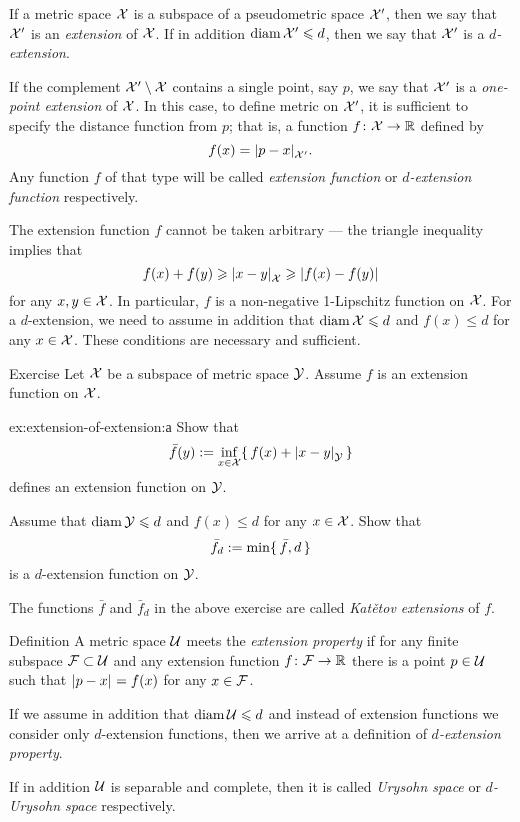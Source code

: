 If a metric space $\mathcal{X}$ is a subspace of a pseudometric space $\mathcal{X}'$, then we say that $\mathcal{X}'$ is an \emph{extension} of $\mathcal{X}$.
If in addition $\operatorname{\rm diam}\nolimits\mathcal{X}'\leqslant d$, then we say that $\mathcal{X}'$ is a {}\emph{$d$-extension}. %

If the complement $\mathcal{X}'\setminus \mathcal{X}$ contains a single point, say $p$, we say that $\mathcal{X}'$ is a \emph{one-point extension} of $\mathcal{X}$.
In this case, to define metric on $\mathcal{X}'$, it is sufficient to specify the distance function from $p$; that is, a function $f\colon\mathcal{X}\to\mathbb{R}$ defined by 
\[f(x)=\dist{p}{x}{\spc{X}'}.\]
Any function $f$ of that type will be called \emph{extension function}\label{page:extension function} or {}\emph{$d$-extension function} respectively.

The extension function $f$ cannot be taken arbitrary --- the triangle inequality implies that 
\[f(x)+f(y)\ge \dist{x}{y}{\spc{X}}\ge |f(x)-f(y)|\]
for any $x,y\in \mathcal{X}$.
In particular, $f$ is a non-negative 1-Lipschitz function on $\mathcal{X}$.
For a $d$-extension, we need to assume in addition that $\diam\spc{X}\z\le d$ and $f(x)\le d$ for any $x\in \mathcal{X}$.
These conditions are necessary and sufficient.

\begin{thm}{Exercise}\label{ex:extension-of-extension}
Let $\mathcal{X}$ be a subspace of metric space $\mathcal{Y}$.
Assume $f$ is an extension function on $\mathcal{X}$.

\begin{subthm}{ex:extension-of-extension:а}
Show that 
\[\bar f(y)
\df
\inf_{x\in \spc{X}} \{\,f(x)+\dist{x}{y}{\spc{Y}}\,\}\]
defines an extension function on $\mathcal{Y}$.
\end{subthm}

\begin{subthm}{}
Assume that $\operatorname{\rm diam}\nolimits \mathcal{Y}\leqslant d$ and $f(x)\le d$ for any $x\in  \mathcal{X}$.
Show that 
\[\bar f_d
\mathrel{:=}
\min \{\, \bar f,d\,\}\]
is a $d$-extension function on $\mathcal{Y}$.
\end{subthm}

\end{thm}

The functions $\bar f$ and $\bar f_d$ in the above exercise are called \emph{Katětov extensions} of $f$.

\begin{thm}{Definition}\label{def:finite+1}
A metric space $\mathcal{U}$ meets the \emph{extension property}  if for any finite subspace $\mathcal{F}\subset\mathcal{U}$ and any extension function $f\colon\mathcal{F}\to\mathbb{R}$ there is a point $p\in \mathcal{U}$ such that $\dist{p}{x}{}=f(x)$ for any $x\in \mathcal{F}$.

If we assume in addition that $\operatorname{\rm diam}\nolimits \mathcal{U}\leqslant d$ and instead of extension functions we consider only $d$-extension functions, then we arrive at a definition of {}\emph{$d$-extension property}.

If in addition $\mathcal{U}$ is separable and complete, then it is called \emph{Urysohn space} or {}\emph{$d$-Urysohn space} respectively.
\end{thm}


